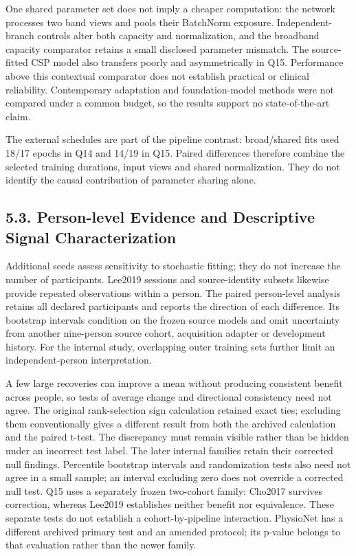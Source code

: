 \documentclass[11pt]{article}
\begin{document}
One shared parameter set does not imply a cheaper computation: the network processes two band views and pools their BatchNorm exposure. Independent-branch controls alter both capacity and normalization, and the broadband capacity comparator retains a small disclosed parameter mismatch. The source-fitted CSP model also transfers poorly and asymmetrically in Q15. Performance above this contextual comparator does not establish practical or clinical reliability. Contemporary adaptation and foundation-model methods were not compared under a common budget, so the results support no state-of-the-art claim.

The external schedules are part of the pipeline contrast: broad/shared fits used 18/17 epochs in Q14 and 14/19 in Q15. Paired differences therefore combine the selected training durations, input views and shared normalization. They do not identify the causal contribution of parameter sharing alone.

\subsection*{5.3. Person-level Evidence and Descriptive Signal Characterization}
Additional seeds assess sensitivity to stochastic fitting; they do not increase the number of participants. Lee2019 sessions and source-identity subsets likewise provide repeated observations within a person. The paired person-level analysis retains all declared participants and reports the direction of each difference. Its bootstrap intervals condition on the frozen source models and omit uncertainty from another nine-person source cohort, acquisition adapter or development history. For the internal study, overlapping outer training sets further limit an independent-person interpretation.

A few large recoveries can improve a mean without producing consistent benefit across people, so tests of average change and directional consistency need not agree. The original rank-selection sign calculation retained exact ties; excluding them conventionally gives a different result from both the archived calculation and the paired t-test. The discrepancy must remain visible rather than be hidden under an incorrect test label. The later internal families retain their corrected null findings. Percentile bootstrap intervals and randomization tests also need not agree in a small sample; an interval excluding zero does not override a corrected null test. Q15 uses a separately frozen two-cohort family: Cho2017 survives correction, whereas Lee2019 establishes neither benefit nor equivalence. These separate tests do not establish a cohort-by-pipeline interaction. PhysioNet has a different archived primary test and an amended protocol; its p-value belongs to that evaluation rather than the newer family.
\end{document}
